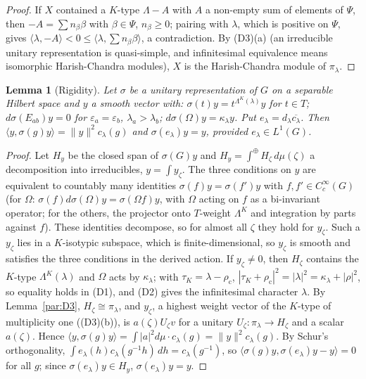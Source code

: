 \documentclass[10pt]{amsart}
\newtheorem{lemma}[theorem]{Lemma}
\theoremstyle{definition}
\theoremstyle{remark}
\begin{document}
\begin{proof}
If $X$ contained a $K$-type $\Lambda-A$ with $A$ a non-empty sum of elements of $\Psi$, then $-A=\sum n_\beta\beta$ with $\beta\in\Psi$, $n_\beta\ge0$; pairing with $\lambda$, which is positive on $\Psi$, gives $\langle\lambda,-A\rangle<0\le\langle\lambda,\sum n_\beta\beta\rangle$, a contradiction. By (D3)(a) (an irreducible unitary representation is quasi-simple, and infinitesimal equivalence means isomorphic Harish-Chandra modules), $X$ is the Harish-Chandra module of $\pi_\lambda$.
\end{proof}

\begin{lemma}[Rigidity]\label{par:rigid}
Let $\sigma$ be a unitary representation of $G$ on a separable Hilbert space and $y$ a smooth
vector with: $\sigma(t)y=t^{\Lambda^K(\lambda)}y$ for $t\in T$; $d\sigma(E_{ab})y=0$ for
$\varepsilon_a=\varepsilon_b$, $\lambda_a>\lambda_b$; $d\sigma(\Omega)y=\kappa_\lambda y$. Put
$e_\lambda=d_\lambda\overline{c_\lambda}$. Then $\langle y,\sigma(g)y\rangle=\|y\|^2c_\lambda(g)$ and
$\sigma(e_\lambda)y=y$, provided $e_\lambda\in L^1(G)$.
\end{lemma}
\begin{proof}
Let $H_y$ be the closed span of $\sigma(G)y$ and $H_y=\int^\oplus H_\zeta\,d\mu(\zeta)$ a
decomposition into irreducibles, $y=\int y_\zeta$. The three conditions on $y$ are equivalent to
countably many identities $\sigma(f)y=\sigma(f')y$ with $f,f'\in C_c^\infty(G)$ (for $\Omega$: $\sigma(f)
d\sigma(\Omega)y=\sigma(\Omega f)y$, with $\Omega$ acting on $f$ as a bi-invariant operator; for the
others, the projector onto $T$-weight $\Lambda^K$ and integration by parts against $f$). These
identities decompose, so for almost all $\zeta$ they hold for $y_\zeta$. Such a $y_\zeta$ lies in a
$K$-isotypic subspace, which is finite-dimensional, so $y_\zeta$ is smooth and satisfies the three
conditions in the derived action. If $y_\zeta\ne0$, then $H_\zeta$ contains the $K$-type
$\Lambda^K(\lambda)$ and $\Omega$ acts by $\kappa_\lambda$; with $\tau_K=\lambda-\rho_{\mathrm c}$,
$|\tau_K+\rho_{\mathrm c}|^2=|\lambda|^2=\kappa_\lambda+|\rho|^2$, so equality holds in (D1), and (D2)
gives the infinitesimal character $\lambda$. By Lemma~\ref{par:D3}, $H_\zeta\cong\pi_\lambda$, and $y_\zeta$, a
highest weight vector of the $K$-type of multiplicity one ((D3)(b)), is $a(\zeta)U_\zeta v$ for a unitary
$U_\zeta:\pi_\lambda\to H_\zeta$ and a scalar $a(\zeta)$. Hence $\langle y,\sigma(g)y\rangle=
\int|a|^2d\mu\cdot c_\lambda(g)=\|y\|^2c_\lambda(g)$. By Schur's orthogonality,
$\int e_\lambda(h)c_\lambda(g^{-1}h)\,dh=c_\lambda(g^{-1})$, so $\langle\sigma(g)y,\sigma(e_\lambda)y-
y\rangle=0$ for all $g$; since $\sigma(e_\lambda)y\in H_y$, $\sigma(e_\lambda)y=y$.
\end{proof}
\end{document}
